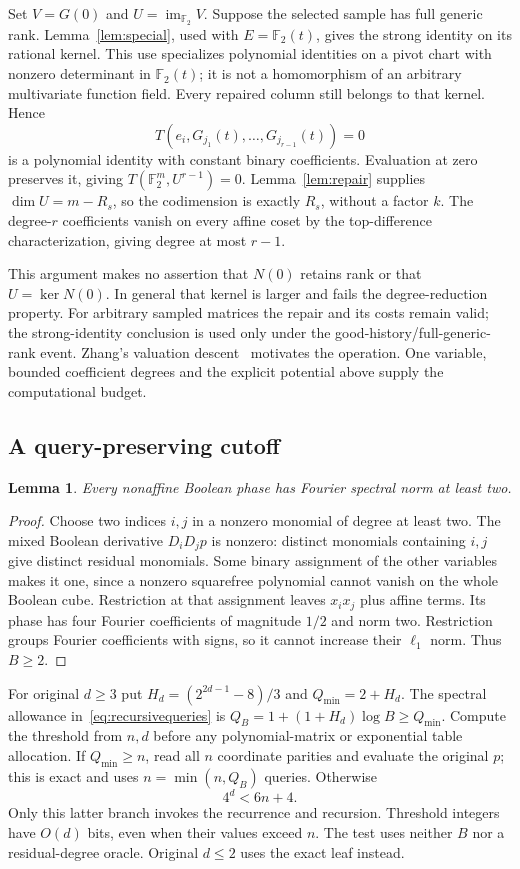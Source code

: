 \documentclass[11pt]{article}
\newtheorem{lemma}[theorem]{Lemma}
\theoremstyle{remark}\newtheorem{remark}[theorem]{Remark}
\newcommand{\F}{\mathbb F}
\begin{document}
Set $V=G(0)$ and $U=\operatorname{im}_{\F_2}V$. Suppose the selected sample has full generic rank. Lemma~\ref{lem:special}, used with $E=\F_2(t)$, gives the strong identity on its rational kernel. This use specializes polynomial identities on a pivot chart with nonzero determinant in $\F_2(t)$; it is not a homomorphism of an arbitrary multivariate function field. Every repaired column still belongs to that kernel. Hence
\[
 T(e_i,G_{j_1}(t),\ldots,G_{j_{r-1}}(t))=0
\]
is a polynomial identity with constant binary coefficients. Evaluation at zero preserves it, giving $T(\F_2^m,U^{r-1})=0$. Lemma~\ref{lem:repair} supplies $\dim U=m-R_s$, so the codimension is exactly $R_s$, without a factor $k$. The degree-$r$ coefficients vanish on every affine coset by the top-difference characterization, giving degree at most $r-1$.

This argument makes no assertion that $N(0)$ retains rank or that $U=\ker N(0)$. In general that kernel is larger and fails the degree-reduction property. For arbitrary sampled matrices the repair and its costs remain valid; the strong-identity conclusion is used only under the good-history/full-generic-rank event. Zhang's valuation descent~\cite[Lemma~3.14]{Z26} motivates the operation. One variable, bounded coefficient degrees and the explicit potential above supply the computational budget.

\subsection{A query-preserving cutoff}\label{sec:cutoff}
\begin{lemma}\label{lem:gap}
Every nonaffine Boolean phase has Fourier spectral norm at least two.
\end{lemma}
\begin{proof}
Choose two indices $i,j$ in a nonzero monomial of degree at least two. The mixed Boolean derivative $D_iD_jp$ is nonzero: distinct monomials containing $i,j$ give distinct residual monomials. Some binary assignment of the other variables makes it one, since a nonzero squarefree polynomial cannot vanish on the whole Boolean cube. Restriction at that assignment leaves $x_ix_j$ plus affine terms. Its phase has four Fourier coefficients of magnitude $1/2$ and norm two. Restriction groups Fourier coefficients with signs, so it cannot increase their $\ell_1$ norm. Thus $B\ge2$.
\end{proof}

For original $d\ge3$ put $H_d=(2^{2d-1}-8)/3$ and $Q_{\min}=2+H_d$. The spectral allowance in~\eqref{eq:recursivequeries} is $Q_B=1+(1+H_d)\log B\ge Q_{\min}$. Compute the threshold from $n,d$ before any polynomial-matrix or exponential table allocation. If $Q_{\min}\ge n$, read all $n$ coordinate parities and evaluate the original $p$; this is exact and uses $n=\min(n,Q_B)$ queries. Otherwise
\begin{equation}\label{eq:cutoff}
 4^d<6n+4.
\end{equation}
Only this latter branch invokes the recurrence and recursion. Threshold integers have $O(d)$ bits, even when their values exceed $n$. The test uses neither $B$ nor a residual-degree oracle. Original $d\le2$ uses the exact leaf instead.
\end{document}
